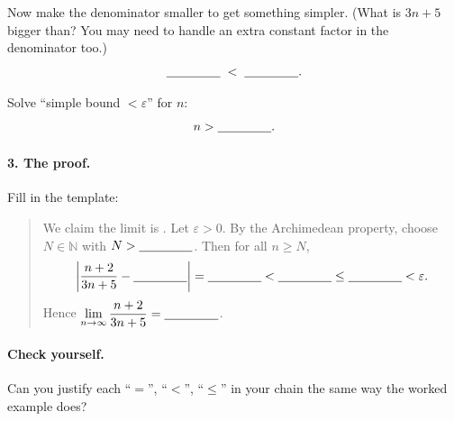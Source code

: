 \documentclass[11pt]{article}
\newcommand{\blank}{\underline{\hspace{1.5cm}}}
\begin{document}
Now make the denominator smaller to get something simpler. (What is
$3n+5$ bigger than? You may need to handle an extra constant factor in
the denominator too.)
\[
  \blank \;<\; \blank .
\]

Solve ``simple bound $<\varepsilon$'' for $n$:
\[
  n > \blank .
\]

\vspace{1cm}

\paragraph{3. The proof.} Fill in the template:
\begin{quote}
We claim the limit is \blank. Let $\varepsilon>0$. By the Archimedean
property, choose $N\in\mathbb{N}$ with $N>\blank$. Then for all
$n\ge N$,
\[
  \left|\frac{n+2}{3n+5}-\blank\right|
  = \blank
  < \blank
  \le \blank
  < \varepsilon .
\]
Hence $\displaystyle\lim_{n\to\infty}\frac{n+2}{3n+5}=\blank$.
\end{quote}

\paragraph{Check yourself.} Can you justify each ``$=$'', ``$<$'',
``$\le$'' in your chain the same way the worked example does?
\end{document}
